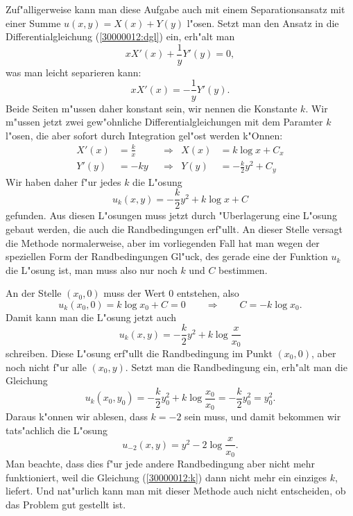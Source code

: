 \begin{diskussion}
Zuf"alligerweise kann man diese Aufgabe auch mit einem Separationsansatz
mit einer Summe $u(x,y)= X(x) + Y(y)$ l"osen.
Setzt man den Ansatz in die Differentialgleichung (\ref{30000012:dgl}) ein,
erh"alt man
\[
xX'(x) +\frac1yY'(y)=0,
\]
was man leicht separieren kann:
\[
xX'(x) = - \frac1yY'(y).
\]
Beide Seiten m"ussen daher konstant sein, wir nennen die Konstante $k$.
Wir m"ussen jetzt zwei gew"ohnliche Differentialgleichungen mit dem Paramter
$k$ l"osen, die aber sofort durch Integration gel"ost werden k"Onnen:
\begin{align*}
X'(x)&=\frac{k}{x}&&\Rightarrow&X(x)&=k\log x + C_x      \\
Y'(y)&=-ky        &&\Rightarrow&Y(y)&=-\frac{k}2y^2 + C_y
\end{align*}
Wir haben daher f"ur jedes $k$ die L"osung
\[
u_k(x,y)=-\frac{k}2 y^2 + k\log x + C
\]
gefunden.
Aus diesen L"osungen muss jetzt durch "Uberlagerung eine L"osung 
gebaut werden, die auch die Randbedingungen erf"ullt.
An dieser Stelle versagt die Methode normalerweise, aber im vorliegenden
Fall hat man wegen der speziellen Form der Randbedingungen Gl"uck, des
gerade eine der Funktion $u_k$ die L"osung ist, man muss also
nur noch $k$ und $C$ bestimmen.

An der Stelle $(x_0,0)$ muss der Wert $0$ entstehen, also
\[
u_k(x_0,0) = k\log x_0 + C=0
\qquad\Rightarrow\qquad C=-k\log x_0.
\]
Damit kann man die L"osung jetzt auch
\[
u_k(x,y)=-\frac{k}{2}y^2 +k\log\frac{x}{x_0}
\]
schreiben.
Diese L"osung erf"ullt die Randbedingung im Punkt $(x_0,0)$, aber noch
nicht f"ur alle $(x_0,y)$.
Setzt man die Randbedingung ein, erh"alt man die Gleichung
\begin{equation}
u_k(x_0,y_0) = -\frac{k}{2}y_0^2 +k\log\frac{x_0}{x_0} = -\frac{k}{2}y_0^2=y_0^2.
\label{30000012:k}
\end{equation}
Daraus k"onnen wir ablesen, dass $k=-2$ sein muss, und damit bekommen
wir tats"achlich die L"osung
\[
u_{-2}(x,y)=y^2 -2\log\frac{x}{x_0}.
\]
Man beachte, dass dies f"ur jede andere Randbedingung aber nicht mehr
funktioniert, weil die Gleichung (\ref{30000012:k}) dann nicht mehr
ein einziges $k$, liefert.
Und nat"urlich kann man mit dieser Methode auch nicht entscheiden, ob
das Problem gut gestellt ist.


\end{diskussion}
